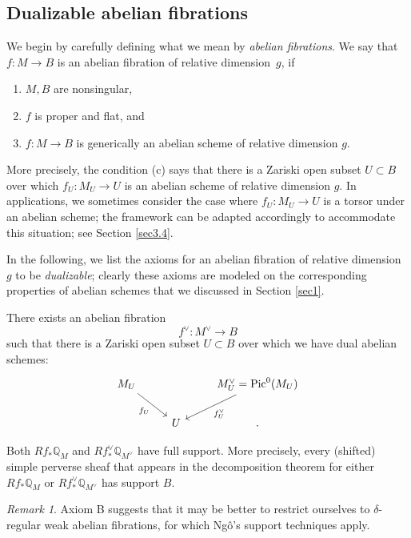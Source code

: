 \documentclass[11pt]{amsart}
\theoremstyle{plain}
\theoremstyle{definition}
\theoremstyle{remark}
\newtheorem{rmk}[thm]{Remark}
\newcommand{\BQ}{{\mathbb{Q}}}
\begin{document}
\subsection{Dualizable abelian fibrations}\label{sec2.2}

We begin by carefully defining what we mean by \emph{abelian fibrations}. We say that $f: M\to B$ is an abelian fibration of relative dimension~$g$, if
\begin{enumerate}
    \item[(a)] $M, B$ are nonsingular,
    \item[(b)] $f$ is proper and flat, and
    \item[(c)] $f: M\to B$ is generically an abelian scheme of relative dimension $g$.
\end{enumerate}
More precisely, the condition (c) says that there is a Zariski open subset $U \subset B$ over which $f_U: M_U \to U$ is an abelian scheme of relative dimension $g$. In applications, we sometimes consider the case where $f_U: M_U \to U $ is a torsor under an abelian scheme; the framework can be adapted accordingly to accommodate this situation; see Section \ref{sec3.4}.



In the following, we list the axioms for an abelian fibration of relative dimension $g$ to be \emph{dualizable}; clearly these axioms are modeled on the corresponding properties of abelian schemes that we discussed in Section \ref{sec1}.
\medskip

 There exists an abelian fibration
\[
f^\vee: M^\vee \to B
\]
such that there is a Zariski open subset $U \subset B$ over which we have dual abelian schemes: 
\begin{equation}\label{dual_U}
\begin{tikzcd}
M_U \arrow[dr, "f_U"'] & & M_U^\vee = \mathrm{Pic}^0(M_U) \arrow[dl, "f_U^\vee"] \\
& U &.
\end{tikzcd}
\end{equation}

\medskip

 Both $Rf_* \BQ_M$ and $Rf^\vee_* \BQ_{M^\vee}$ have full support. More precisely, every (shifted) simple perverse sheaf that appears in the decomposition theorem for either $Rf_* \BQ_M$ or $Rf^\vee_* \BQ_{M^\vee}$ has support $B$.

\begin{rmk}
Axiom B suggests that it may be better to restrict ourselves to $\delta$-regular weak abelian fibrations, for which Ng\^o's support techniques \cite{Ngo} apply. 
\end{rmk}
\medskip
\end{document}
